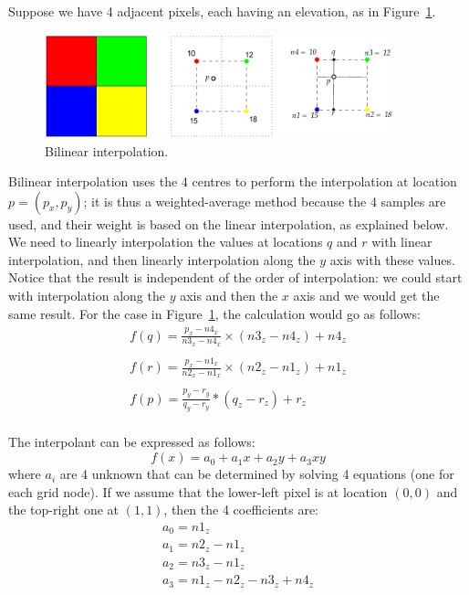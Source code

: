 Suppose we have 4 adjacent pixels, each having an elevation, as in Figure~\ref{fig:bilinear}.
\begin{figure}
  \centering
  \includegraphics[width=0.9\textwidth]{figs/bilinear}
  \caption{Bilinear interpolation.} 
\label{fig:bilinear}
\end{figure}
Bilinear interpolation uses the 4 centres to perform the interpolation at location $p = (p_x, p_y)$; it is thus a weighted-average method because the 4 samples are used, and their weight is based on the linear interpolation, as explained below.
We need to linearly interpolation the values at locations $q$ and $r$ with linear interpolation, and then linearly interpolation along the $y$ axis with these values. 
Notice that the result is independent of the order of interpolation: we could start with interpolation along the $y$ axis and then the $x$ axis and we would get the same result. For the case in Figure~\ref{fig:bilinear}, the calculation would go as follows:
\[
  \begin{array}{l}
    f(q) = \frac{p_x - n4_x}{n3_x - n4_x} \times (n3_z - n4_z) + n4_z \\
   \\
    f(r) = \frac{p_x - n1_x}{n2_x - n1_x} \times  (n2_z - n1_z) + n1_z \\
    \\
    f(p) = \frac{p_y - r_y}{q_y - r_y} * (q_z - r_z) + r_z \\
  \end{array}
\]

The interpolant can be expressed as follows:
\begin{equation}
  f(x) = a_0 + a_1x + a_2y + a_3xy
\end{equation}
where $a_i$ are 4 unknown that can be determined by solving 4 equations (one for each grid node). If we assume that the lower-left pixel is at location $(0,0)$ and the top-right one at $(1,1)$, then the 4 coefficients are:
\[
  \begin{array}{l}
    a_0 = n1_z \\
    a_1 = n2_z - n1_z \\
    a_2 = n3_z - n1_z \\
    a_3 = n1_z -n2_z - n3_z + n4_z
  \end{array}
\]


